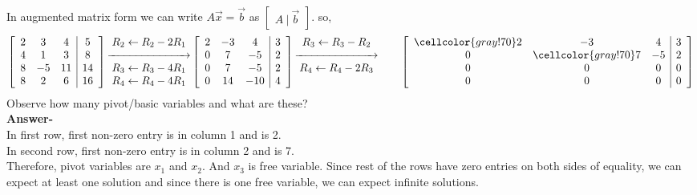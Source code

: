 \documentclass{article}
\newcommand\bg{\cellcolor{gray!70}}
\begin{document}
In augmented matrix form we can write $A\vec{x} = \vec{b}$ as $\begin{bmatrix}
    A~|~\vec{b}
\end{bmatrix}$. so,\\
\[
 \left[\begin{array}{ccc|c}
     2 &3 &4 &5\\
     4 &1 &3 &8\\
     8 &-5 &11 &14\\
     8 &2 &6 &16\\
  \end{array}\right]
  \begin{matrix}
    R_2\leftarrow R_2 - 2R_1\\
    \xrightarrow{\hspace*{2.5cm}}\\
    R_3\leftarrow R_3 - 4R_1\\
    R_4\leftarrow R_4 - 4R_1\\
  \end{matrix}
  \left[\begin{array}{ccc|c}
     2 &-3 &4 &3\\
     0 &7 &-5 &2\\
     0 &7 &-5 &2\\
     0 &14 &-10 &4\\
  \end{array}\right]
  \begin{matrix}
    R_3\leftarrow R_3 - R_2\\
    \xrightarrow{\hspace*{2.5cm}}\\
    R_4\leftarrow R_4 - 2R_3\\
    &&\\
  \end{matrix}
  \left[\begin{array}{ccc|c}
    \bg2 &-3 &4 &3\\
     0 &\bg7 &-5 &2\\
     0 &0 &0 &0\\
     0 &0 &0 &0\\
  \end{array}\right]
\]
Observe how many pivot/basic variables and what are these?\\
\textbf{Answer-}\\In first row, first non-zero entry is in column 1 and is 2.\\
In second row, first non-zero entry is in column 2 and is 7.\\
Therefore, pivot variables are $x_1$ and $x_2$. And $x_3$ is free variable. Since rest of the rows have zero entries on both sides of equality, we can expect at least one solution and since there is one free variable, we can expect infinite solutions.\\
\end{document}
